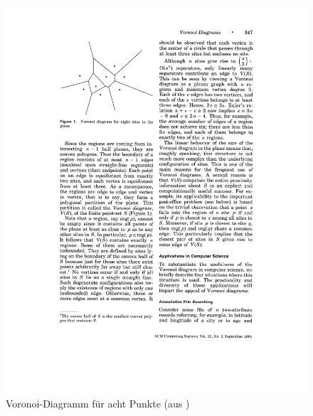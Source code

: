 \begin{figure}[htbp]
\centering
\includegraphics{grafics/voronoi_grund_aus_aurenhammer.pdf}
\caption{Voronoi-Diagramm für acht Punkte (aus \cite{Aurenhammer1991Voronoi})}
\label{fig:voronoi_grund}
\end{figure}



